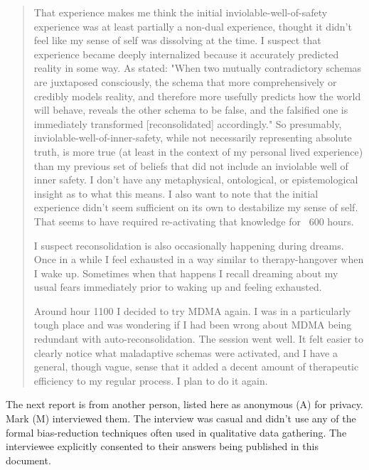 \documentclass[12pt,letterpaper]{book}
\begin{document}
\begin{quotation}
    That experience makes me think the initial inviolable-well-of-safety experience was at least partially a non-dual experience, thought it didn't feel like my sense of self was dissolving at the time. I suspect that experience became deeply internalized because it accurately predicted reality in some way. As \textcite{ecker2015misunderstood} stated: "When two mutually contradictory schemas are juxtaposed consciously, the schema that more comprehensively or credibly models reality, and therefore more usefully predicts how the world will behave, reveals the other schema to be false, and the falsified one is immediately transformed [reconsolidated] accordingly." So presumably, inviolable-well-of-inner-safety, while not necessarily representing absolute truth, is more true (at least in the context of my personal lived experience) than my previous set of beliefs that did not include an inviolable well of inner safety. I don't have any metaphysical, ontological, or epistemological insight as to what this means. I also want to note that the initial experience didn't seem sufficient on its own to destabilize my sense of self. That seems to have required re-activating that knowledge for ~600 hours.

    I suspect reconsolidation is also occasionally happening during dreams. Once in a while I feel exhausted in a way similar to therapy-hangover when I wake up. Sometimes when that happens I recall dreaming about my usual fears immediately prior to waking up and feeling exhausted.

    Around hour 1100 I decided to try MDMA again. I was in a particularly tough place and was wondering if I had been wrong about MDMA being redundant with auto-reconsolidation. The session went well. It felt easier to clearly notice what maladaptive schemas were activated, and I have a general, though vague, sense that it added a decent amount of therapeutic efficiency to my regular process. I plan to do it again.
\end{quotation}
The next report is from another person, listed here as anonymous (A) for privacy. Mark (M) interviewed them. The interview was casual and didn't use any of the formal bias-reduction techniques often used in qualitative data gathering. The interviewee explicitly consented to their answers being published in this document.
\end{document}
